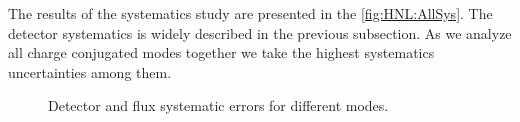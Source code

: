 \documentclass[../main.tex]{subfiles}
\begin{document}
The results of the systematics study are presented in the \autoref{fig:HNL:AllSys}. The detector systematics is widely described in the previous subsection. As we analyze all charge conjugated modes together we take the highest systematics uncertainties among them.

\begin{figure}[!ht]
    \begin{center}
    \begin{minipage}{0.49\linewidth}
    \end{minipage}
    \hfill
    \begin{minipage}{0.49\linewidth}
    \end{minipage}
    \vfill
    \begin{minipage}{0.49\linewidth}
    \end{minipage}
    \caption{Detector and flux systematic errors for different modes.}
    \label{fig:HNL:AllSys}
        \end{center}
\end{figure}
\end{document}
